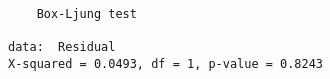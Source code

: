 \begin{verbatim} 

	Box-Ljung test

data:  Residual
X-squared = 0.0493, df = 1, p-value = 0.8243

\end{verbatim}
